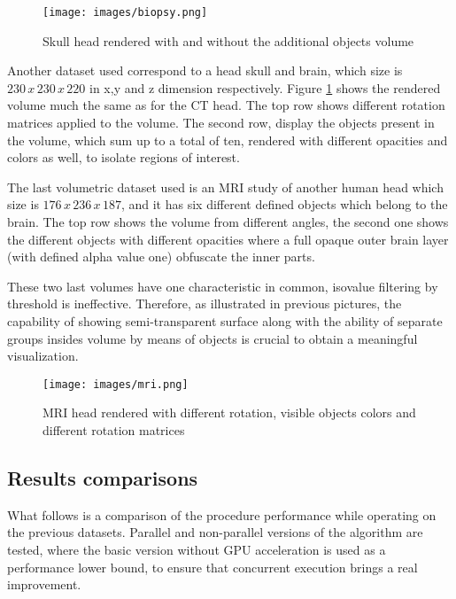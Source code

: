 \documentclass[12pt,a4paper]{extarticle}
\newcommand{\linespace}{\vspace{8pt}}
\begin{document}
\begin{figure}[hbtp]
\centering
\texttt{[image: images/biopsy.png]}
\caption{Skull head rendered with and without the additional objects volume}
\label{fig:biopsy}
\end{figure}


Another dataset used correspond to a head skull and brain, which size is $230\,x\,230\,x\,220$ in x,y and z dimension respectively.
Figure \ref{fig:biopsy} shows the rendered volume much the same as for the CT head. The top row shows different rotation matrices applied to the volume. The second row, display the objects present in the volume, which sum up to a total of ten, rendered with different opacities and colors as well, to isolate regions of interest.
\linespace

The last volumetric dataset used is an MRI study of another human head which size is $176\,x\,236\,x\,187$, and it has six different defined objects which belong to the brain. The top row shows the volume from different angles, the second one shows the different objects with different opacities where a full opaque outer brain layer (with defined alpha value one) obfuscate the inner parts.
\linespace 

These two last volumes have one characteristic in common, isovalue filtering by threshold is ineffective. Therefore, as illustrated in previous pictures, the capability of showing semi-transparent surface along with the ability of separate groups insides volume by means of objects is crucial to obtain a meaningful visualization.
\pagebreak

\begin{figure}[hbtp]
\centering
\texttt{[image: images/mri.png]}
\caption{MRI head rendered with different rotation, visible objects colors and different rotation matrices }
\label{fig:mri}
\end{figure}
\subsection{Results comparisons} 
What follows is a comparison of the procedure performance while operating on the previous datasets. Parallel and non-parallel versions of the algorithm are tested, where the basic version without GPU acceleration is used as a performance lower bound, to ensure that concurrent execution brings a real improvement.
\end{document}
